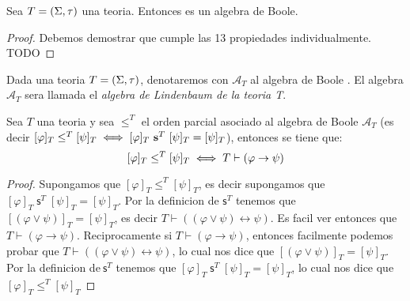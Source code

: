 \begin{theorem}
  Sea $T=(\Sigma,\tau)$ una teoria. Entonces \algLin es un algebra de Boole.
\end{theorem}
\begin{proof}
  Debemos demostrar que cumple las 13 propiedades individualmente. TODO
\end{proof}

\begin{definition}
  Dada una teoria $T=(\Sigma,\tau)$, denotaremos con $\mathcal{A}_T$ al algebra de Boole \algLin. El algebra
  $\mathcal{A}_T$ sera llamada el \emph{algebra de Lindenbaum de la teoria T}. 
\end{definition}
\begin{lemma}
  Sea $T$ una teoria y sea $\leq^T$ el orden parcial asociado al algebra de Boole $\mathcal{A}_T$ (es decir $[\varphi]_T\leq^T [\psi]_T  \iff [\varphi]_T\ \mathbf{s}^T\ [\psi]_T=[\psi]_T$),
  entonces se tiene que:
  $$
  [\varphi]_T\leq^T[\psi]_T \iff T\vdash(\varphi\rightarrow\psi)
  $$
\end{lemma}
\begin{proof}
  Supongamos que $[\varphi ]_{T}\leq ^{T}[\psi ]_{T}$, es decir supongamos que 
  $[\varphi ]_{T}\;\mathsf{s}^{T}\mathsf{\;}[\psi ]_{T}=[\psi ]_{T}$. Por la
  definicion de $\mathsf{s}^{T}$ tenemos que $[(\varphi \vee \psi )]_{T}=[\psi
  ]_{T}$, es decir $T\vdash ((\varphi \vee \psi )\leftrightarrow \psi )$. Es
  facil ver entonces que $T\vdash \left( \varphi \rightarrow \psi \right) $.
  Reciprocamente si $T\vdash \left( \varphi \rightarrow \psi \right) $,
  entonces facilmente podemos probar que $T\vdash ((\varphi \vee \psi
  )\leftrightarrow \psi )$, lo cual nos dice que $[(\varphi \vee \psi
  )]_{T}=[\psi ]_{T}$. Por la definicion de$\ \mathsf{s}^{T}$ tenemos que $%
  [\varphi ]_{T}\;\mathsf{s}^{T}\mathsf{\;}[\psi ]_{T}=[\psi ]_{T}$, lo cual
  nos dice que $[\varphi ]_{T}\leq ^{T}[\psi ]_{T}$
\end{proof}